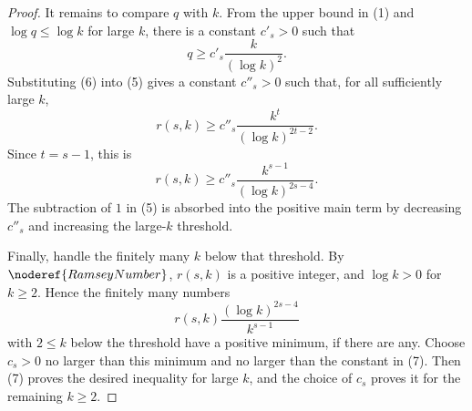 \begin{proof}
It remains to compare \(q\) with \(k\).  From the upper bound in (1) and
\(\log q\le \log k\) for large \(k\), there is a constant \(c'_s>0\) such
that
\[
  q\ge c'_s\frac{k}{(\log k)^2}. \tag{6}
\]
Substituting (6) into (5) gives a constant \(c''_s>0\) such that, for all
sufficiently large \(k\),
\[
  r(s,k)
  \ge
  c''_s\frac{k^t}{(\log k)^{2t-2}}.
\]
Since \(t=s-1\), this is
\[
  r(s,k)
  \ge
  c''_s\frac{k^{s-1}}{(\log k)^{2s-4}}. \tag{7}
\]
The subtraction of \(1\) in (5) is absorbed into the positive main term by
decreasing \(c''_s\) and increasing the large-\(k\) threshold.

Finally, handle the finitely many \(k\) below that threshold.  By
\(\noderef{RamseyNumber}\), \(r(s,k)\) is a positive integer, and
\(\log k>0\) for \(k\ge2\).  Hence the finitely many numbers
\[
  r(s,k)\frac{(\log k)^{2s-4}}{k^{s-1}}
\]
with \(2\le k\) below the threshold have a positive minimum, if there are any.
Choose \(c_s>0\) no larger than this minimum and no larger than the constant
in (7).  Then (7) proves the desired inequality for large \(k\), and the
choice of \(c_s\) proves it for the remaining \(k\ge2\).
\end{proof}
